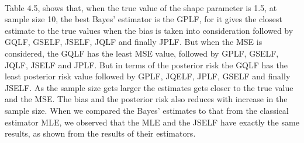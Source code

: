 \documentclass[a4paper,12pt]{report}
\begin{document}
\begin{minipage}{\linewidth}
		
\end{minipage}
\\\vspace{1cm}

\indent Table 4.5, shows that, when the true value of the shape parameter is 1.5, at sample size 10, the best Bayes’ estimator is the GPLF, for it gives the closest estimate to the true values when the bias is taken into consideration followed by GQLF, GSELF, JSELF, JQLF and finally JPLF. But when the MSE is considered, the GQLF has the least MSE value, followed by GPLF, GSELF, JQLF, JSELF and JPLF. But in terms of the posterior risk  the GQLF has the least posterior risk value followed by GPLF, JQELF, JPLF, GSELF and finally JSELF.
As the sample size gets larger the estimates gets closer to the true value and the MSE. The bias and the posterior risk also reduces with increase in the sample size. When we compared the Bayes’ estimates to that from the classical estimator MLE, we observed that the MLE and the JSELF have exactly the same results, as shown from the results of their estimators.\\
\end{document}
